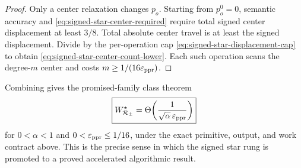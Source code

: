 \begin{proof}
Only a center relaxation changes $p_o$.  Starting from $p_o^0=0$, semantic
accuracy and \eqref{eq:signed-star-center-required} require total signed
center displacement at least $3/8$.  Total absolute center travel is at least
the signed displacement.  Divide by the per-operation cap
\eqref{eq:signed-star-displacement-cap} to obtain
\eqref{eq:signed-star-center-count-lower}.  Each such operation scans the
degree-$m$ center and costs $m\ge1/(16\varepsilon_{\rm ppr})$.
\end{proof}

Combining 
gives the promised-family class theorem
\begin{equation}
  \boxed{
  W^{\star}_{\mathcal R_{\pm}}
  =\Theta\!\left(
      \frac{1}{\sqrt\alpha\,\varepsilon_{\rm ppr}}
    \right)}
  \label{eq:signed-star-class-theta}
\end{equation}
for $0<\alpha<1$ and
$0<\varepsilon_{\rm ppr}\le1/16$, under the exact primitive, output, and
work contract above.  This is the precise sense in which the signed star rung
is promoted to a proved accelerated algorithmic result.
